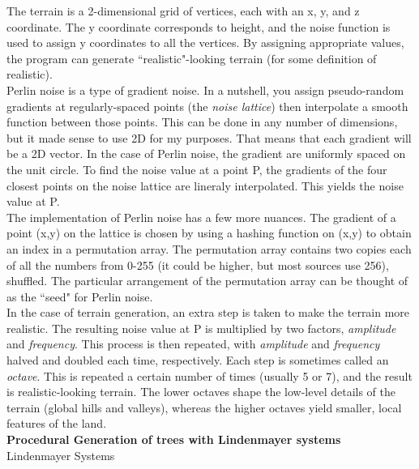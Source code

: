 \documentclass{article}
\begin{document}
	The terrain is a 2-dimensional grid of vertices, each with an x, y, and z coordinate. The y coordinate corresponds to height, and the noise function is used to assign y coordinates to all the vertices. By assigning appropriate values, the program can generate ``realistic"-looking terrain (for some definition of realistic).
	\\

	Perlin noise is a type of gradient noise. In a nutshell, you assign pseudo-random gradients at regularly-spaced points (the \textit{noise lattice}) then interpolate a smooth function between those points. This can be done in any number of dimensions, but it made sense to use 2D for my purposes. That means that each gradient will be a 2D vector. In the case of Perlin noise, the gradient are uniformly spaced on the unit circle. To find the noise value at a point P, the gradients of the four closest points on the noise lattice are lineraly interpolated. This yields the noise value at P.
	\\

	The implementation of Perlin noise has a few more nuances. The gradient of a point (x,y) on the lattice is chosen by using a hashing function on (x,y) to obtain an index in a permutation array. The permutation array contains two copies each of all the numbers from 0-255 (it could be higher, but most sources use 256), shuffled. The particular arrangement of the permutation array can be thought of as the ``seed" for Perlin noise.
	\\

	In the case of terrain generation, an extra step is taken to make the terrain more realistic. The  resulting noise value at P is multiplied by two factors, \textit{amplitude} and \textit{frequency}. This process is then repeated, with \textit{amplitude} and \textit{frequency} halved and doubled each time, respectively. Each step is sometimes called an \textit{octave}. This is repeated a certain number of times (usually 5 or 7), and the result is realistic-looking terrain. The lower octaves shape the low-level details of the terrain (global hills and valleys), whereas the higher octaves yield smaller, local features of the land.
	\\

	\large\noindent\textbf{Procedural Generation of trees with Lindenmayer systems}
	\normalsize
	\\

	Lindenmayer Systems

\newpage
\end{document}
